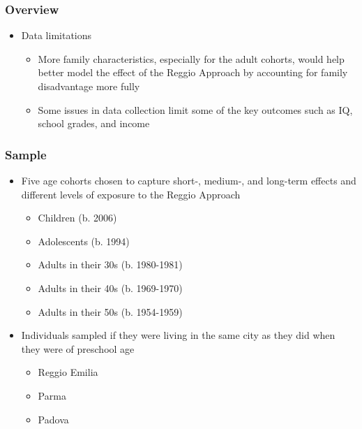 \documentclass[static]{JJH-Beamer_PAGENOS}
\begin{document}
\begin{frame}
\frametitle{Overview}
\begin{itemize}
	\item Data limitations
	\begin{itemize}
		\item More family characteristics, especially for the adult cohorts, would help better model the effect of the Reggio Approach by accounting for family disadvantage more fully
		\item Some issues in data collection limit some of the key outcomes such as IQ, school grades, and income
	\end{itemize}
\end{itemize}
\end{frame}

\begin{frame}
\frametitle{Sample}
\begin{itemize}
	\item Five age cohorts chosen to capture short-, medium-, and long-term effects and different levels of exposure to the Reggio Approach
	\begin{itemize}
		\item Children (b. 2006)
		\item Adolescents (b. 1994)
		\item Adults in their 30s (b. 1980-1981)
		\item Adults in their 40s (b. 1969-1970)
		\item Adults in their 50s (b. 1954-1959)
	\end{itemize}
	\item Individuals sampled if they were living in the same city as they did when they were of preschool age
		\begin{itemize}
			\item Reggio Emilia
			\item Parma
			\item Padova
		\end{itemize}
\end{itemize}
\end{frame}

\end{document}
